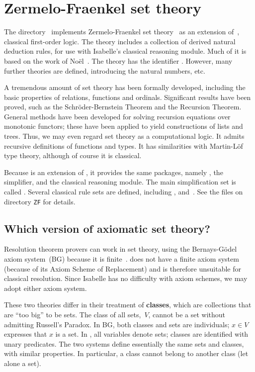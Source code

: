 \chapter{Zermelo-Fraenkel set theory}
The directory~ implements Zermelo-Fraenkel set
theory~\cite{halmos60,suppes72} as an extension of~, classical
first-order logic.  The theory includes a collection of derived natural
deduction rules, for use with Isabelle's classical reasoning module.  Much
of it is based on the work of No\"el~\cite{noel}.  The theory has the {\ML}
identifier .  However, many further theories
are defined, introducing the natural numbers, etc.

A tremendous amount of set theory has been formally developed, including
the basic properties of relations, functions and ordinals.  Significant
results have been proved, such as the Schr\"oder-Bernstein Theorem and the
Recursion Theorem.  General methods have been developed for solving
recursion equations over monotonic functors; these have been applied to
yield constructions of lists and trees.  Thus, we may even regard set
theory as a computational logic.  It admits recursive definitions of
functions and types.  It has similarities with Martin-L\"of type theory,
although of course it is classical.

Because {\ZF} is an extension of {\FOL}, it provides the same packages,
namely , the simplifier, and the classical reasoning
module.  The main simplification set is called .
Several classical rule sets are defined, including ,
 and~.  See the files on directory
{\tt ZF} for details.


\section{Which version of axiomatic set theory?}
Resolution theorem provers can work in set theory, using the
Bernays-G\"odel axiom system~(BG) because it is
finite~\cite{boyer86,quaife92}.  {\ZF} does not have a finite axiom system
(because of its Axiom Scheme of Replacement) and is therefore unsuitable
for classical resolution.  Since Isabelle has no difficulty with axiom
schemes, we may adopt either axiom system.

These two theories differ in their treatment of {\bf classes}, which are
collections that are ``too big'' to be sets.  The class of all sets,~$V$,
cannot be a set without admitting Russell's Paradox.  In BG, both classes
and sets are individuals; $x\in V$ expresses that $x$ is a set.  In {\ZF}, all
variables denote sets; classes are identified with unary predicates.  The
two systems define essentially the same sets and classes, with similar
properties.  In particular, a class cannot belong to another class (let
alone a set).

